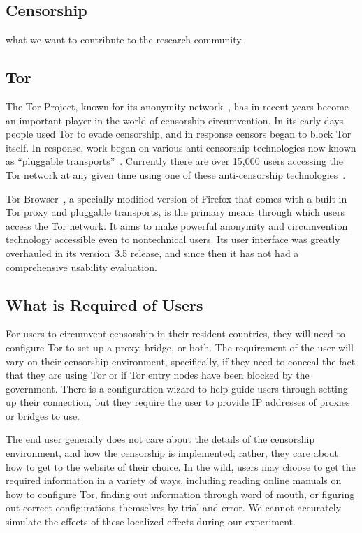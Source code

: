 \documentclass[letterpaper,twocolumn,11pt]{article}
\begin{document}
\subsection{Censorship} %

{\color {red} what we want to contribute to the research community.}

\subsection{Tor} 

\indent \indent The Tor Project, known for its anonymity network~\cite{tor-design},
has in recent years become an important player in the world of
censorship circumvention.
In its early days, people used Tor to evade censorship,
and in response censors began to block Tor itself.
In response, work began on various anti-censorship technologies
now known as ``pluggable transports''~\cite{pluggable-transports}.
Currently there are over 15,000 users accessing the Tor network
at any given time using one of these
anti-censorship technologies~\cite{userstats-bridge-country}.

Tor Browser~\cite{tor-browser},
a specially modified version of Firefox that comes
with a built-in Tor proxy and pluggable transports,
is the primary means through which users access the Tor network.
It aims to make powerful anonymity and circumvention technology
accessible even to nontechnical users.
Its user interface was greatly overhauled in its version~3.5 release,
and since then it has not had a comprehensive usability evaluation.

\subsection{What is Required of Users}
\indent \indent For users to circumvent censorship in their resident countries, they will need to 
configure Tor to set up a proxy, bridge, or both. The requirement of the user will vary on their censorship
environment, specifically, if they need to conceal the fact that they are using Tor or if Tor entry nodes 
have been blocked by the government. There is a configuration wizard to help guide users through setting up their connection, but they require the user to provide IP addresses of proxies or bridges to use.

The end user generally does not care about the details of the 
censorship environment, and how the censorship is implemented; rather, they care about how to get
to the website of their choice. In the wild, users may choose to get the required information in a variety 
of ways, including reading online manuals on how to configure Tor, finding out information through word of mouth, 
or figuring out correct configurations themselves by trial and error.  We cannot accurately simulate the effects
of these localized effects during our experiment.
\end{document}
